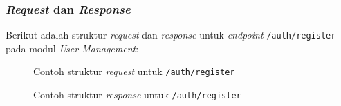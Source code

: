 \subsubsection{\textit{Request} dan \textit{Response}}
Berikut adalah struktur \textit{request} dan \textit{response} untuk \textit{endpoint} \texttt{/auth/register} pada modul \textit{User Management}:
\begin{figure}
    \centering
    \caption{Contoh struktur \textit{request} untuk \texttt{/auth/register}}
    \label{fig:request_register_user}
\end{figure}

\begin{figure}
    \centering
    \caption{Contoh struktur \textit{response} untuk \texttt{/auth/register}}
    \label{fig:response_register_user}
\end{figure}

